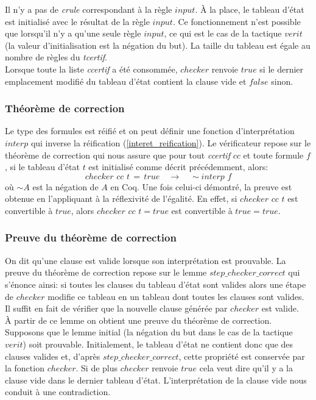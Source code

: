 \documentclass[11pt]{article}
\begin{document}
Il n'y a pas de \textit{crule} correspondant à la règle $input$. À la place, le tableau d'état est initialisé avec le résultat de la règle $input$. Ce fonctionnement n'est possible que lorsqu'il n'y a qu'une seule règle $input$, ce qui est le cas de la tactique $verit$ (la valeur d'initialisation est la négation du but). La taille du tableau est égale au nombre de règles du \textit{tcertif}. \\

Lorsque toute la liste \textit{ccertif} a été consommée, $checker$ renvoie $true$ si le dernier emplacement modifié du tableau d'état contient la clause vide et $false$ sinon.

\subsubsection{Théorème de correction}

Le type des formules est réifié et on peut définir une fonction d'interprétation $interp$ qui inverse la réification (\ref{interet_reification}). Le vérificateur repose sur le théorème de correction qui nous assure que pour tout \textit{ccertif} $cc$ et toute formule $f$, si le tableau d'état $t$ est initialisé comme décrit précédemment,  alors: 
\[ checker  \,\, cc \,\, t \, = \, true \quad \rightarrow \quad \sim  interp \, \, f \]
où $\sim A$ est la négation de $A$ en Coq. Une fois celui-ci démontré, la preuve est obtenue en l'appliquant à la réflexivité de l'égalité. En effet, si $checker  \,\, cc\,\, t  $ est convertible à $true$, alors $checker  \,\, cc\,\, t = true $ est convertible à $true = true$.

\subsubsection{Preuve du théorème de correction} \label{preuve_correction}

On dit qu'une clause est valide lorsque son interprétation est prouvable. La preuve du théorème de correction repose sur le lemme $step\_checker\_correct$ qui s'énonce ainsi: si toutes les clauses du tableau d'état sont valides alors une étape de $checker$ modifie ce tableau en un tableau dont toutes les clauses sont valides. Il suffit en fait de vérifier que la nouvelle clause générée par $checker$ est valide. \\ 

À partir de ce lemme on obtient une preuve du théorème de correction. Supposons que le lemme initial (la négation du but dans le cas de la tactique $verit$) soit prouvable. Initialement, le tableau d'état ne contient donc que des clauses valides et, d'après $step\_checker\_correct$, cette propriété est conservée par la fonction $checker$. Si  de plus $checker$ renvoie $true$ cela veut dire qu'il y a la clause vide dans le dernier tableau d'état. L'interprétation de la clause vide nous conduit à une contradiction.
\end{document}
